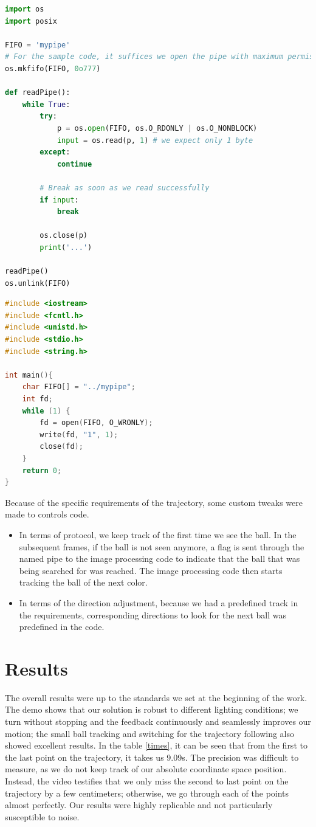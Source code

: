 \documentclass[12pt, twoside, a4paper, titlepage]{article}
\begin{document}
\begin{lstlisting}[language=Python, caption=creating and reading from pipe]
import os
import posix

FIFO = 'mypipe'
# For the sample code, it suffices we open the pipe with maximum permissions
os.mkfifo(FIFO, 0o777)

def readPipe():
    while True:
        try:
            p = os.open(FIFO, os.O_RDONLY | os.O_NONBLOCK)
            input = os.read(p, 1) # we expect only 1 byte
        except:
            continue
        
        # Break as soon as we read successfully 
        if input:
            break

        os.close(p)
        print('...')

readPipe()
os.unlink(FIFO)
\end{lstlisting}

\begin{lstlisting}[language=C++, caption=write to pipe]
#include <iostream>
#include <fcntl.h>
#include <unistd.h>
#include <stdio.h>
#include <string.h>

int main(){
    char FIFO[] = "../mypipe";
    int fd;
    while (1) {
        fd = open(FIFO, O_WRONLY);
        write(fd, "1", 1);
        close(fd);
    }
    return 0;
}

\end{lstlisting}

Because of the specific requirements of the trajectory, some custom tweaks were made to controls code.
\begin{itemize}
\item In terms of protocol, we keep track of the first time we see the ball. In the subsequent frames, if the ball is not seen anymore, a flag is sent through the named pipe to the image processing code to indicate that the ball that was being searched for was reached. The image processing code then starts tracking the ball of the next color.
\item In terms of the direction adjustment, because we had a predefined track in the requirements, corresponding directions to look for the next ball was predefined in the code.
\end{itemize}

\section{Results}
The overall results were up to the standards we set at the beginning of the work. The demo shows that our solution is robust to different lighting conditions; we turn without stopping and the feedback continuously and seamlessly improves our motion; the small ball tracking and switching for the trajectory following also showed excellent results. In the table \ref{times}, it can be seen that from the first to the last point on the trajectory, it takes us 9.09s. The precision was difficult to measure, as we do not keep track of our absolute coordinate space position. Instead, the video testifies that we only miss the second to last point on the trajectory by a few centimeters; otherwise, we go through each of the points almost perfectly. Our results were highly replicable and not particularly susceptible to noise.
\end{document}

